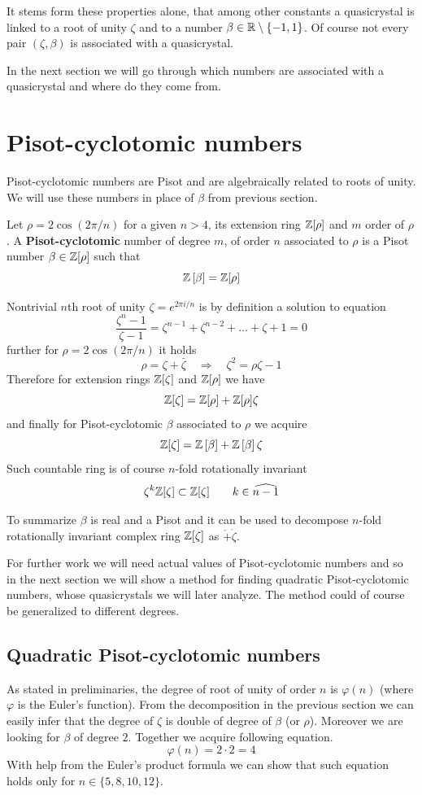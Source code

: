 \documentclass[text.tex]{subfiles}
\begin{document}
It stems form these properties alone, that among other constants a quasicrystal is linked to a root of unity $\zeta$ and to a number $\beta\in\mathbb{R}\setminus\{-1,1\}$. Of course not every pair $(\zeta, \beta)$ is associated with a quasicrystal.

In the next section we will go through which numbers are associated with a quasicrystal and where do they come from. 

\section{Pisot-cyclotomic numbers}\label{sec_pisotCyclotomic}%
Pisot-cyclotomic numbers are Pisot and are algebraically related to roots of unity. We will use these numbers in place of $\beta$ from previous section. 

\begin{definition}\label{def_pisotCyclotomic}
Let $\rho = 2\cos\left(2\pi/n\right)$ for a given $n>4$, its extension ring $\mathbb{Z}[\rho]$ and $m$ order of $\rho$. A \textbf{Pisot-cyclotomic} number of degree $m$, of order $n$ associated to $\rho$ is a Pisot number $\beta \in \mathbb{Z}[\rho]$ such that
$$\mathbb{Z}\left[\beta\right] = \mathbb{Z}[\rho]$$
\end{definition}

Nontrivial $n$th root of unity $\zeta = e^{2\pi i/n}$ is by definition a solution to equation
$$\frac{\zeta^n-1}{\zeta-1} = \zeta^{n-1}+\zeta^{n-2}+\dots+\zeta+1 = 0$$
further for $\rho = 2\cos\left(2\pi/n\right)$ it holds
$$\rho = \zeta + \bar{\zeta}\quad\Rightarrow\quad \zeta^2 = \rho\zeta - 1$$
Therefore for extension rings $\mathbb{Z}[\zeta]$ and $\mathbb{Z}[\rho]$ we have
$$\mathbb{Z}[\zeta] = \mathbb{Z}[\rho] + \mathbb{Z}[\rho]\zeta$$
and finally for Pisot-cyclotomic $\beta$ associated to $\rho$ we acquire
$$\mathbb{Z}[\zeta] = \mathbb{Z}\left[\beta\right] + \mathbb{Z}\left[\beta\right]\zeta$$
Such countable ring is of course $n$-fold rotationally invariant
$$\zeta^k\mathbb{Z}[\zeta] \subset \mathbb{Z}[\zeta]\qquad k\in\widehat{n-1}$$

To summarize $\beta$ is real and a Pisot and it can be used to decompose $n$-fold rotationally invariant complex ring $\mathbb{Z}[\zeta]$ as $\ring + \ring\zeta$. 

For further work we will need actual values of Pisot-cyclotomic numbers and so in the next section we will show a method for finding quadratic Pisot-cyclotomic numbers, whose quasicrystals we will later analyze. The method could of course be generalized to different degrees. 

\subsection{Quadratic Pisot-cyclotomic numbers}
As stated in preliminaries, the degree of root of unity of order $n$ is $\varphi(n)$ (where $\varphi$ is the Euler's function). From the decomposition in the previous section we can easily infer that the degree of $\zeta$ is double of degree of $\beta$ (or $\rho$). Moreover we are looking for $\beta$ of degree $2$. Together we acquire following equation. 
$$\varphi(n) = 2\cdot 2 = 4$$
With help from the Euler's product formula we can show that such equation holds only for $n\in\{5,8,10,12\}$. 
\end{document}
